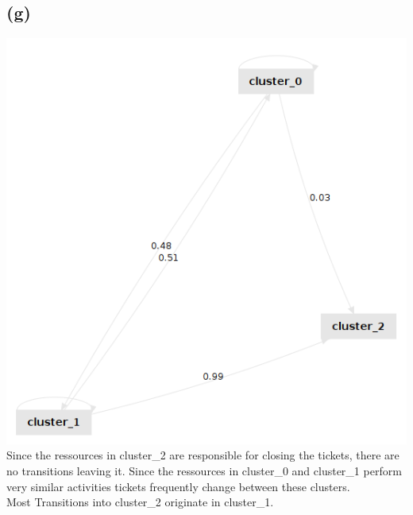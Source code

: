 \documentclass[../../main.tex]{subfiles}
\begin{document}
\subsection*{(g)}
\includegraphics[width=\columnwidth]{img/RapidMiner_g_Graph.png}
Since the ressources in cluster\_2 are responsible for closing the tickets, there are no transitions leaving it. Since the ressources in cluster\_0 and cluster\_1 perform very similar activities tickets frequently change between these clusters.\\
Most Transitions into cluster\_2 originate in cluster\_1.
\end{document}
